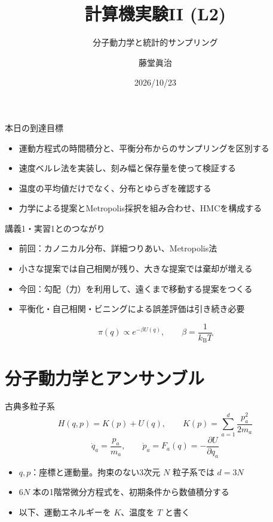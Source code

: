 \documentclass[10pt,aspectratio=169]{beamer}
\title{計算機実験II (L2)}
\subtitle{分子動力学と統計的サンプリング}
\author{藤堂眞治}
\date{2026/10/23}
\begin{document}
\begin{frame}
  \titlepage
\end{frame}

\begin{frame}{本日の到達目標}
\begin{itemize}
\item 運動方程式の時間積分と、平衡分布からのサンプリングを区別する
\item 速度ベルレ法を実装し、刻み幅と保存量を使って検証する
\item 温度の平均値だけでなく、分布とゆらぎを確認する
\item 力学による提案とMetropolis採択を組み合わせ、HMCを構成する
\end{itemize}
\end{frame}

\begin{frame}{講義1・実習1とのつながり}
\begin{itemize}
\item 前回：カノニカル分布、詳細つりあい、Metropolis法
\item 小さな提案では自己相関が残り、大きな提案では棄却が増える
\item 今回：勾配（力）を利用して、遠くまで移動する提案をつくる
\item 平衡化・自己相関・ビニングによる誤差評価は引き続き必要
\end{itemize}
\[
\pi(q)\propto e^{-\beta U(q)},\qquad
\beta=\frac{1}{k_{\mathrm B}T}
\]
\end{frame}

\section{分子動力学とアンサンブル}

\begin{frame}{古典多粒子系}
\[
H(q,p)=K(p)+U(q),\qquad K(p)=\sum_{a=1}^{d}\frac{p_a^2}{2m_a}
\]
\[
\dot q_a=\frac{p_a}{m_a},\qquad
\dot p_a=F_a(q)=-\frac{\partial U}{\partial q_a}
\]
\begin{itemize}
\item $q,p$：座標と運動量。拘束のない3次元 $N$ 粒子系では $d=3N$
\item $6N$ 本の1階常微分方程式を、初期条件から数値積分する
\item 以下、運動エネルギーを $K$、温度を $T$ と書く
\end{itemize}
\end{frame}
\end{document}
